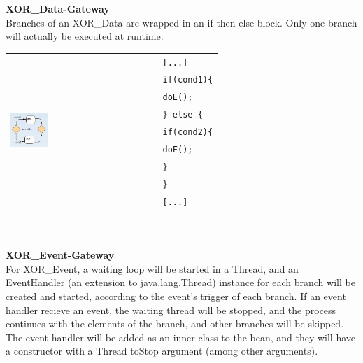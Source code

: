 \textbf{XOR\_Data-Gateway}\\
Branches of an XOR\_Data are wrapped in an if-then-else block. Only one branch will actually be executed at runtime. \\

\begin{tabularx}{\linewidth}{lcX}
	\multirow{9}{*}{\includegraphics[width=0.3\textwidth]{images/mapping/xor-data.png}} &  & \texttt{[...]}\\
	& & \texttt{if(cond1)\{}\\
	& & \texttt{\hspace{10pt}doE();}\\
	& & \texttt{\} else \{}\\
	& \textbf{\textcolor{blue}{=}} & \texttt{\hspace{10pt}if(cond2)\{}\\
	& & \texttt{\hspace{20pt}doF();}\\
	& & \texttt{\hspace{10pt}\}}\\
	& & \texttt{\}}\\
	& & \texttt{[...]}\\
\end{tabularx}\\\\

\textbf{XOR\_Event-Gateway}\\
For XOR\_Event, a waiting loop will be started in a Thread, and an EventHandler (an extension to java.lang.Thread) instance for each branch will be created and started, according to the event's trigger of each branch. If an event handler recieve an event, the waiting thread will be stopped, and the process continues with the elements of the branch, and other branches will be skipped. The event handler will be added as an inner class to the bean, and they will have a constructor with a Thread toStop argument (among other arguments). \\

